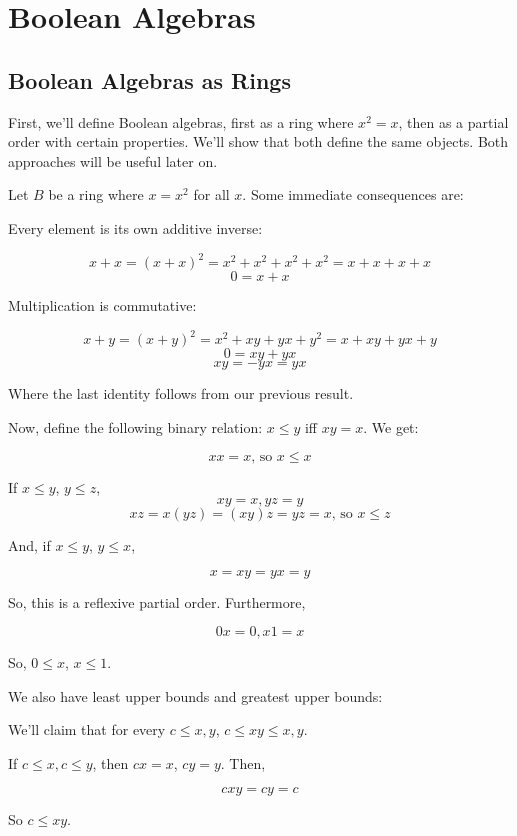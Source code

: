 \documentclass{article}
\begin{document}
  \section{Boolean Algebras}

    \subsection{Boolean Algebras as Rings}

      First, we'll define Boolean algebras, first as a ring where $x^2=x$, then as
      a partial order with certain properties. We'll show that both define the
      same objects. Both approaches will be useful later on.

      Let $B$ be a ring where $x = x^2$ for all $x$. Some immediate consequences
      are:

      Every element is its own additive inverse:

      \[ x + x = (x + x)^2 = x^2 + x^2 + x^2 + x^2 = x + x + x + x\] \[0 = x + x\]

      Multiplication is commutative:

      \[ x + y = (x + y)^2 = x^2 + xy + yx + y^2 = x + xy + yx + y\] \[0 = xy +
      yx\] \[xy = -yx = yx\]

      Where the last identity follows from our previous result.

      Now, define the following binary relation: $x \leq y$ iff $xy = x$. We get:

      \[xx = x \text{, so } x \leq x\]

      If $x \leq y$, $y \leq z$, \[xy = x, yz = y\] \[xz = x(yz) = (xy)z = yz = x
      \text{, so } x \leq z\]

      And, if $x \leq y$, $y \leq x$,

      \[x = xy = yx = y\]

      So, this is a reflexive partial order. Furthermore,

      \[0x = 0, x1 = x\]

      So, $0 \leq x$, $x \leq 1$.

      We also have least upper bounds and greatest upper bounds:

      We'll claim that for every $c \leq x,y$, $c \leq xy \leq x,y$.

      If $c \leq x, c \leq y$, then $cx = x$, $cy = y$. Then,

      \[ cxy = cy = c\]

      So $c \leq xy$.
\end{document}
